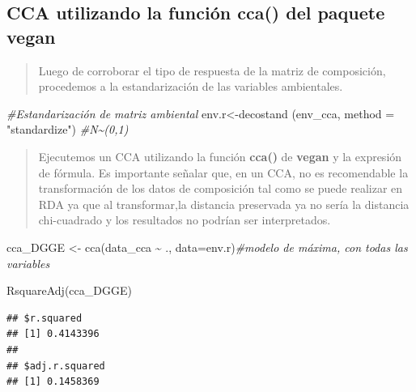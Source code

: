 \documentclass[
]{book}
\newenvironment{Shaded}{\begin{snugshade}}{\end{snugshade}}
\newcommand{\AttributeTok}[1]{\textcolor[rgb]{0.77,0.63,0.00}{#1}}
\newcommand{\CommentTok}[1]{\textcolor[rgb]{0.56,0.35,0.01}{\textit{#1}}}
\newcommand{\FunctionTok}[1]{\textcolor[rgb]{0.00,0.00,0.00}{#1}}
\newcommand{\NormalTok}[1]{#1}
\newcommand{\OtherTok}[1]{\textcolor[rgb]{0.56,0.35,0.01}{#1}}
\newcommand{\SpecialCharTok}[1]{\textcolor[rgb]{0.00,0.00,0.00}{#1}}
\newcommand{\StringTok}[1]{\textcolor[rgb]{0.31,0.60,0.02}{#1}}
\begin{document}
\hypertarget{cca-utilizando-la-funciuxf3n-cca-del-paquete-vegan}{%
\subsection{\texorpdfstring{CCA utilizando la función \textbf{cca()} del paquete \textbf{vegan}}{CCA utilizando la función cca() del paquete vegan}}\label{cca-utilizando-la-funciuxf3n-cca-del-paquete-vegan}}

\begin{quote}
Luego de corroborar el tipo de respuesta de la matriz de composición, procedemos a la estandarización de las variables ambientales.
\end{quote}

\begin{Shaded}
\begin{Highlighting}[]
\CommentTok{\#Estandarización de matriz ambiental}
\NormalTok{env.r}\OtherTok{\textless{}{-}}\FunctionTok{decostand}\NormalTok{ (env\_cca, }\AttributeTok{method =} \StringTok{"standardize"}\NormalTok{) }\CommentTok{\#N\textasciitilde{}(0,1)}
\end{Highlighting}
\end{Shaded}

\begin{quote}
Ejecutemos un CCA utilizando la función \textbf{cca()} de \textbf{vegan} y la expresión de fórmula. Es importante señalar que, en un CCA, no es recomendable la transformación de los datos de composición tal como se puede realizar en RDA ya que al transformar,la distancia preservada ya no sería la distancia chi-cuadrado y los resultados no podrían ser interpretados.
\end{quote}

\begin{Shaded}
\begin{Highlighting}[]
\NormalTok{cca\_DGGE }\OtherTok{\textless{}{-}} \FunctionTok{cca}\NormalTok{(data\_cca }\SpecialCharTok{\textasciitilde{}}\NormalTok{ ., }\AttributeTok{data=}\NormalTok{env.r)}\CommentTok{\#modelo de máxima, con todas las variables}

\FunctionTok{RsquareAdj}\NormalTok{(cca\_DGGE) }
\end{Highlighting}
\end{Shaded}

\begin{verbatim}
## $r.squared
## [1] 0.4143396
## 
## $adj.r.squared
## [1] 0.1458369
\end{verbatim}
\end{document}
